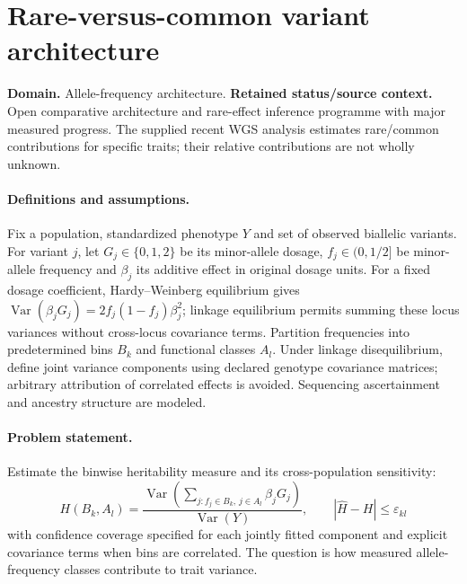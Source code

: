 \documentclass[11pt]{article}
\begin{document}
\section*{Rare-versus-common variant architecture}
\label{prob:024}
\label{rank:121}
\par\smallskip

\noindent\textbf{Domain.} Allele-frequency architecture. \quad \textbf{Retained status/source context.} Open comparative architecture and rare-effect inference programme with major measured progress. The supplied recent WGS analysis estimates rare/common contributions for specific traits; their relative contributions are not wholly unknown.
\paragraph{Definitions and assumptions.} Fix a population, standardized phenotype $Y$ and set of observed biallelic variants. For variant $j$, let $G_j\in\{0,1,2\}$ be its minor-allele dosage, $f_j\in(0,1/2]$ be minor-allele frequency and $\beta_j$ its additive effect in original dosage units. For a fixed dosage coefficient, Hardy--Weinberg equilibrium gives $\operatorname{Var}(\beta_jG_j)=2f_j(1-f_j)\beta_j^2$; linkage equilibrium permits summing these locus variances without cross-locus covariance terms. Partition frequencies into predetermined bins $B_k$ and functional classes $A_l$. Under linkage disequilibrium, define joint variance components using declared genotype covariance matrices; arbitrary attribution of correlated effects is avoided. Sequencing ascertainment and ancestry structure are modeled.
\paragraph{Problem statement.} Estimate the binwise heritability measure and its cross-population sensitivity:
\[
H(B_k,A_l)=\frac{\operatorname{Var}(\sum_{j:f_j\in B_k,\,j\in A_l}\beta_jG_j)}{\operatorname{Var}(Y)},
\qquad |\widehat H-H|\leq\varepsilon_{kl}
\]
with confidence coverage specified for each jointly fitted component and explicit covariance terms when bins are correlated. The question is how measured allele-frequency classes contribute to trait variance.
\end{document}
